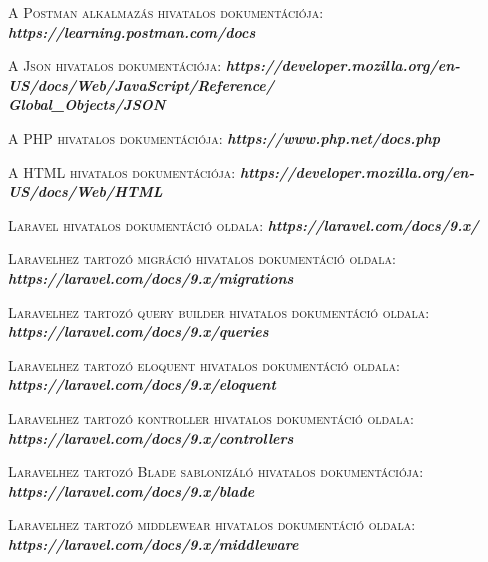 \documentclass[
]{thesis-ekf}
\theoremstyle{definition}
\theoremstyle{remark}
\begin{document}
\begin{thebibliography}{2}
		\textsc{A Postman alkalmazás hivatalos dokumentációja:}
		\newline
		\emph{\bf{https://learning.postman.com/docs}}
		
		\textsc{A Json hivatalos dokumentációja:}
		\newline
		\emph{\bf{https://developer.mozilla.org/en-US/docs/Web/JavaScript/Reference/\\Global\_Objects/JSON}}
		
		\textsc{A PHP hivatalos dokumentációja:}
		\newline
		\emph{\bf{https://www.php.net/docs.php}}
		
		\textsc{A HTML hivatalos dokumentációja:}
		\newline
		\emph{\bf{https://developer.mozilla.org/en-US/docs/Web/HTML}}
		
		\textsc{Laravel hivatalos dokumentáció oldala:}
		\newline
		\emph{\bf{https://laravel.com/docs/9.x/}}
		
		\textsc{Laravelhez tartozó migráció hivatalos dokumentáció oldala:}
		\newline
		\emph{\bf{https://laravel.com/docs/9.x/migrations}}
		
		\textsc{Laravelhez tartozó query builder hivatalos dokumentáció oldala:}
		\newline
		\emph{\bf{https://laravel.com/docs/9.x/queries}}
		
		\textsc{Laravelhez tartozó eloquent hivatalos dokumentáció oldala:}
		\newline
		\emph{\bf{https://laravel.com/docs/9.x/eloquent}}
		
		\textsc{Laravelhez tartozó kontroller hivatalos dokumentáció oldala:}
		\newline
		\emph{\bf{https://laravel.com/docs/9.x/controllers}}
		
		\textsc{Laravelhez tartozó Blade sablonizáló hivatalos dokumentációja:}
		\newline
		\emph{\bf{https://laravel.com/docs/9.x/blade}}
		
		\textsc{Laravelhez tartozó middlewear hivatalos dokumentáció oldala:}
		\newline
		\emph{\bf{https://laravel.com/docs/9.x/middleware}}
		

\end{thebibliography}
\end{document}
